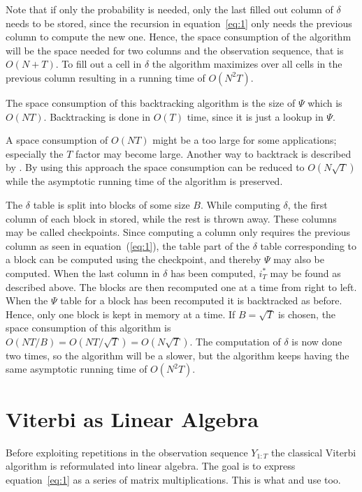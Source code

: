 Note that if only the probability is needed, only the last filled out column of
$\delta$ needs to be stored, since the recursion in equation~\eqref{eq:1} only
needs the previous column to compute the new one. Hence, the space consumption
of the algorithm will be the space needed for two columns and the observation
sequence, that is $O(N + T)$. To fill out a cell in $\delta$ the algorithm
maximizes over all cells in the previous column resulting in a running time of
$O(N^2 T)$.

The space consumption of this backtracking algorithm is the size of $\Psi$
which is $O(N T)$. Backtracking is done in $O(T)$ time, since it is just a
lookup in $\Psi$.

A space consumption of $O(N T)$ might be a too large for some applications;
especially the $T$ factor may become large. Another way to backtrack is
described by \citet{Tarnas01061998}. By using this approach the space
consumption can be reduced to $O(N \sqrt{T})$ while the asymptotic running
time of the algorithm is preserved.

The $\delta$ table is split into blocks of some size $B$. While computing
$\delta$, the first column of each block in stored, while the rest is thrown
away. These columns may be called checkpoints. Since computing a column only
requires the previous column as seen in equation~(\ref{eq:1}), the table part
of the $\delta$ table corresponding to a block can be computed using the
checkpoint, and thereby $\Psi$ may also be computed. When the last column in
$\delta$ has been computed, $i_T^*$ may be found as described above. The blocks
are then recomputed one at a time from right to left. When the $\Psi$ table for
a block has been recomputed it is backtracked as before. Hence, only one block
is kept in memory at a time. If $B = \sqrt{T}$ is chosen, the space consumption
of this algorithm is
$O(N T / B) = O(N T / \sqrt{T}) = O(N \sqrt{T})$. The computation
of $\delta$ is now done two times, so the algorithm will be a slower, but the
algorithm keeps having the same asymptotic running time of $O(N^2 T)$.

\section{Viterbi as Linear Algebra}
\label{sec:algorithm-as-linear}

Before exploiting repetitions in the observation sequence $Y_{1:T}$ the
classical Viterbi algorithm is reformulated into linear algebra. The goal is to
express equation~\eqref{eq:1} as a series of matrix multiplications. This is
what \citet{sand2013ziphmmlib} and \citet{lifshits2009speeding} use too.

